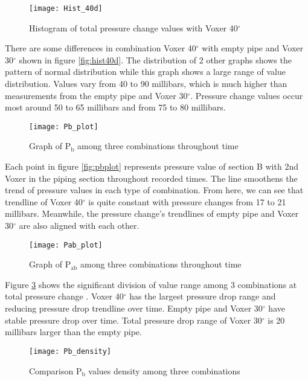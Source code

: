 \begin{figure}[h]
  \centering
  \texttt{[image: Hist\_40d]}
  \caption{ Histogram of total pressure change values  with Voxer 40$^{\circ}$}
  \label{fig:hist40d}
\end{figure}

There are some differences in combination Voxer 40$^{\circ}$ with empty pipe and Voxer 30$^{\circ}$ shown in figure \vref{fig:hist40d}. The distribution of 2 other graphs shows the pattern of normal distribution while this graph shows a large range of value distribution. Values vary from 40 to 90 millibars, which is much higher than measurements from the empty pipe and Voxer 30$^{\circ}$. Pressure change values occur most around 50 to 65 millibars and from 75 to 80 millibars.

\begin{figure}[h]
  \centering
  \texttt{[image: Pb\_plot]}
  \caption{ Graph of P$_{\text{b}}$ among three combinations throughout time}
  \label{fig:pbplot}
\end{figure}

Each point in figure \vref{fig:pbplot} represents pressure value of section B with 2nd Voxer in the piping section throughout recorded times. The line smoothens the trend of pressure values in each type of combination. From here, we can see that trendline of Voxer 40$^{\circ}$ is quite constant with pressure changes from 17 to 21 millibars. Meanwhile, the pressure change's trendlines of empty pipe and Voxer 30$^{\circ}$ are also aligned with each other. 

\begin{figure}[h]
  \centering
  \texttt{[image: Pab\_plot]}
  \caption{ Graph of P$_{\text{ab}}$ among three combinations throughout time}
  \label{fig:pabplot}
\end{figure}

Figure \ref{fig:pabplot} shows the significant division of value range among 3 combinations at total pressure change . Voxer 40$^{\circ}$  has the largest pressure drop range and reducing pressure drop trendline over time. Empty pipe and Voxer 30$^{\circ}$ have stable pressure drop over time. Total pressure drop range of Voxer 30$^{\circ}$ is 20 millibars larger than the empty pipe. 

\begin{figure}[h!]
  \centering
  \texttt{[image: Pb\_density]}
  \caption{ Comparison P$_{\text{b}}$ values density among three combinations}
  \label{fig:pbdensity}
\end{figure}

